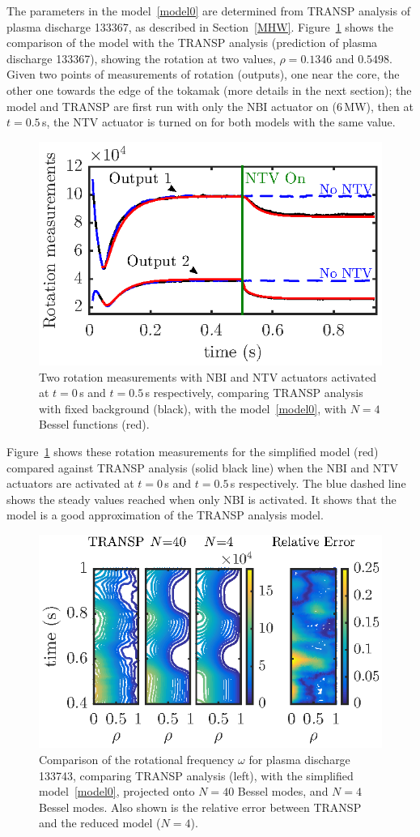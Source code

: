\documentclass[12pt,lot, lof]{puthesis}
\begin{document}
The parameters in the model~\eqref{model0} are determined from TRANSP analysis of plasma discharge 133367, as described in Section~\ref{MHW}.  Figure~\ref{Goum12} shows the comparison of the model with the TRANSP analysis (prediction of plasma discharge 133367), showing the rotation at two values, $\rho=0.1346$ and $0.5498$.
%
Given two points of measurements of rotation (outputs), one near the core, the other one towards the edge of the tokamak (more details in the next section); the model and TRANSP are first run with only the NBI actuator on ($6$\,MW), then at $t=0.5$\,s, the NTV actuator is turned on for both models with the same value. 

\begin{figure}
\centering
\includegraphics[width=0.7 \linewidth]{fig8}
\caption{Two rotation measurements with NBI and NTV actuators activated at $t=0$\,s and $t=0.5$\,s respectively, comparing TRANSP analysis with fixed background (black), with the model~\eqref{model0}, with $N=4$ Bessel functions (red).}
\label{Goum12}
\end{figure}

Figure~\ref{Goum12} shows these rotation measurements for the simplified model (red) compared against TRANSP analysis (solid black line) when the NBI and NTV actuators are activated at $t=0$\,s and $t=0.5$\,s respectively. The blue dashed line shows the steady values reached when only NBI is activated. It shows that the model is a good approximation of the TRANSP analysis model.
\begin{figure}
\includegraphics[width=0.9 \linewidth]{fig9}
\caption{Comparison of the rotational frequency $\omega$ for plasma discharge 133743, comparing TRANSP analysis (left), with the simplified model~\eqref{model0}, projected onto $N=40$ Bessel modes, and $N=4$ Bessel modes.  Also shown is the relative error between TRANSP and the reduced model ($N=4$).}
\label{fig10}
\end{figure}
\end{document}
